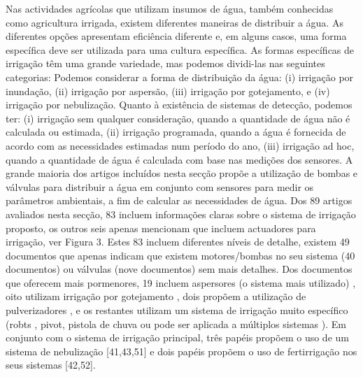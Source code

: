 \documentclass[conference]{IEEEtran}
\begin{document}
Nas actividades agrícolas que utilizam insumos de água, também conhecidas como 
agricultura irrigada, existem diferentes maneiras de distribuir a água. 
As diferentes opções apresentam eficiência diferente e, em alguns casos, 
uma forma específica deve ser utilizada para uma cultura específica. 
As formas específicas de irrigação têm uma grande variedade, mas podemos 
dividi-las nas seguintes categorias: Podemos considerar a forma de distribuição da água: 
(i) irrigação por inundação, (ii) irrigação por aspersão, (iii) irrigação por gotejamento, 
e (iv) irrigação por nebulização. Quanto à existência de sistemas de detecção, podemos ter: 
(i) irrigação sem qualquer consideração, quando a quantidade de água não é calculada ou estimada, 
(ii) irrigação programada, quando a água é fornecida de acordo com as necessidades 
estimadas num período do ano, (iii) irrigação ad hoc, quando a quantidade de água 
é calculada com base nas medições dos sensores. A grande maioria dos artigos incluídos 
nesta secção propõe a utilização de bombas e válvulas para distribuir a água em conjunto 
com sensores para medir os parâmetros ambientais, a fim de calcular as necessidades de água. 
Dos 89 artigos avaliados nesta secção, 83 incluem informações claras sobre o sistema de 
irrigação proposto, os outros seis apenas mencionam que incluem actuadores para irrigação, 
ver Figura 3. Estes 83 incluem diferentes níveis de detalhe, existem 49 documentos que apenas 
indicam que existem motores/bombas no seu sistema (40 documentos) ou válvulas 
(nove documentos) sem mais detalhes. Dos documentos que oferecem mais pormenores, 
19 incluem aspersores (o sistema mais utilizado) \cite{gonzalez2018iot, ahmed2016intelligation, yusuf2005information, cambra2017iot, arvind2017automated, ammour2018factory, singh2019iot, wu2016secure, solanki2017conceptual, wasson2017integration, johar2018iot, ryu2015design, reche2014smart, chieochan2017internet, arumugam2018internet, boonchieng2018smart, rawal2017iot, guo2015design, khattab2016design}, 
oito utilizam irrigação por gotejamento \cite{daskalakis2018uw, nawandar2019iot, barkunan2019smart, sivaprasath2016arduino, kumar2017internet, kodali2016iot, abidin2015web, banumathi2017android}, dois propõem a 
utilização de pulverizadores \cite{mechsy2017mobile}, e os restantes utilizam um sistema de irrigação 
muito específico (robts \cite{rahul2018iot}, pivot, pistola de chuva \cite{vasu2017intelligent} 
ou pode ser aplicada a múltiplos sistemas \cite{agale2017automated}). Em conjunto com o sistema de irrigação principal, 
três papéis propõem o uso de um sistema de nebulização [41,43,51] e dois papéis 
propõem o uso de fertirrigação nos seus sistemas [42,52]. 
\end{document}
